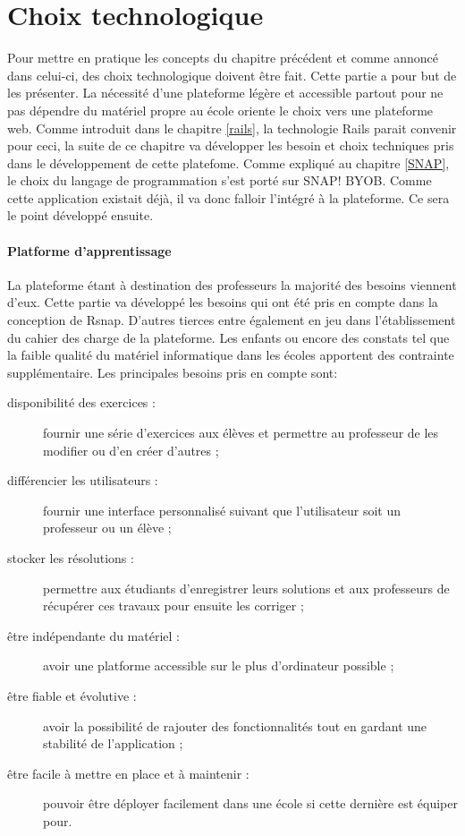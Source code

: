 \section{Choix technologique}
Pour mettre en pratique les concepts du chapitre précédent et comme annoncé dans celui-ci, des choix technologique doivent être fait. Cette partie a pour but de les présenter. La nécessité d'une plateforme légère et accessible partout pour ne pas dépendre du matériel propre au école oriente le choix vers une plateforme web. 
Comme introduit dans le chapitre \ref{rails}, la technologie Rails parait convenir pour ceci, la suite de ce chapitre va développer les besoin et choix techniques pris dans le développement de cette platefome. 
Comme expliqué au chapitre \ref{SNAP}, le choix du langage de programmation s'est porté sur SNAP! BYOB. Comme cette application existait déjà, il va donc falloir l'intégré à la plateforme. Ce sera le point développé ensuite.


\paragraph{Platforme d'apprentissage}
La plateforme étant à destination des professeurs la majorité des besoins viennent d'eux. Cette partie va développé les besoins qui ont été pris en compte dans la conception de Rsnap. D'autres tierces entre également en jeu dans l'établissement du cahier des charge de la plateforme. Les enfants ou encore des constats tel que la faible qualité du matériel informatique dans les écoles apportent des contrainte supplémentaire. Les principales besoins pris en compte sont:
\begin{description}
  \item[disponibilité des exercices :] fournir une série d'exercices aux élèves et permettre au professeur de les modifier ou d'en créer d'autres ;
  \item[différencier les utilisateurs :] fournir une interface personnalisé suivant que l'utilisateur soit un professeur ou un élève ;
  \item[stocker les résolutions :] permettre aux étudiants d'enregistrer leurs solutions et aux professeurs de récupérer ces travaux pour ensuite les corriger ;
  \item[être indépendante du matériel :] avoir une platforme accessible sur le plus d'ordinateur possible ;
  \item[être fiable et évolutive :] avoir la possibilité de rajouter des fonctionnalités tout en gardant une stabilité de l'application ;
  \item[être facile à mettre en place et à maintenir :] pouvoir être déployer facilement dans une école si cette dernière est équiper pour.
\end{description}

